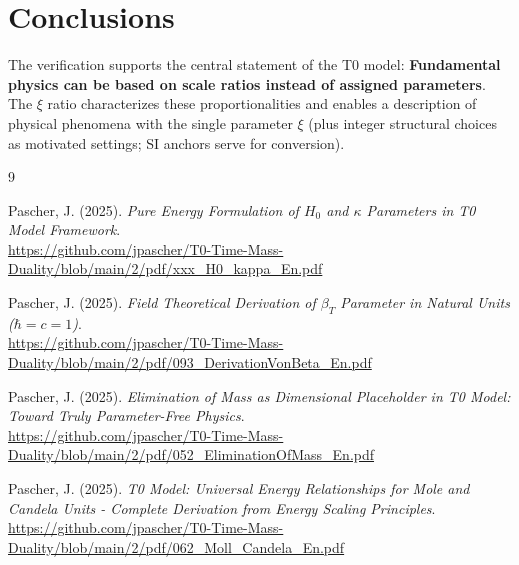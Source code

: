 	\section{Conclusions}
	
	The verification supports the central statement of the T0 model: \textbf{Fundamental physics can be based on scale ratios instead of assigned parameters}. The $\xi$ ratio characterizes these proportionalities and enables a description of physical phenomena with the single parameter $\xi$ (plus integer structural choices as motivated settings; SI anchors serve for conversion).
	
	\begin{thebibliography}{9}
		
		Pascher, J. (2025). \textit{Pure Energy Formulation of $H_0$ and $\kappa$ Parameters in T0 Model Framework}. \\
		\url{https://github.com/jpascher/T0-Time-Mass-Duality/blob/main/2/pdf/xxx_H0_kappa_En.pdf}
		
		Pascher, J. (2025). \textit{Field Theoretical Derivation of $\beta_T$ Parameter in Natural Units ($\hbar = c = 1$)}. \\
		\url{https://github.com/jpascher/T0-Time-Mass-Duality/blob/main/2/pdf/093_DerivationVonBeta_En.pdf}
		
		Pascher, J. (2025). \textit{Elimination of Mass as Dimensional Placeholder in T0 Model: Toward Truly Parameter-Free Physics}. \\
		\url{https://github.com/jpascher/T0-Time-Mass-Duality/blob/main/2/pdf/052_EliminationOfMass_En.pdf}
		
		Pascher, J. (2025). \textit{T0 Model: Universal Energy Relationships for Mole and Candela Units - Complete Derivation from Energy Scaling Principles}. \\
		\url{https://github.com/jpascher/T0-Time-Mass-Duality/blob/main/2/pdf/062_Moll_Candela_En.pdf}
		
	\end{thebibliography}
